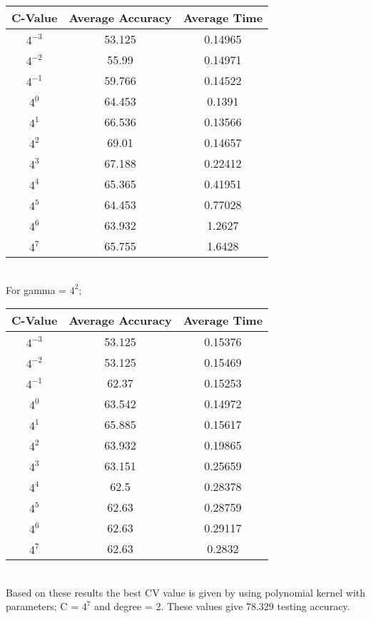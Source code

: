 \documentclass[letter,11pt]{article}
\begin{document}
\begin{tabular}{|c| c |c |} 
	\hline
	C-Value & Average Accuracy & Average Time \\ [0.5ex] 			
	\hline
	$4^{-3}$ & 53.125  & 0.14965 \\ [0.5ex] 
	\hline
	$4^{-2}$ & 55.99  & 0.14971  \\ 
	\hline
	$4^{-1}$ &  59.766  & 0.14522\\
	\hline
	$4^{0}$ & 64.453   & 0.1391\\
	\hline
	$4^{1}$ & 66.536 & 0.13566\\
	\hline
	$4^{2}$ &  69.01 & 0.14657\\
	\hline
	$4^{3}$ &   67.188    & 0.22412\\
	\hline
	$4^{4}$ & 65.365  & 0.41951\\
	\hline
	$4^{5}$ & 64.453      & 0.77028\\
	\hline
	$4^{6}$ &   63.932      & 1.2627\\
	\hline
	$4^{7}$ &  65.755 & 1.6428\\
	\hline	
\end{tabular}\\

For gamma = $4^{2}$;

\begin{tabular}{|c| c |c |} 
	\hline
	C-Value & Average Accuracy & Average Time \\ [0.5ex] 			
	\hline
	$4^{-3}$ & 53.125  & 0.15376 \\ [0.5ex] 
	\hline
	$4^{-2}$ & 53.125   & 0.15469  \\ 
	\hline
	$4^{-1}$ &  62.37   & 0.15253\\
	\hline
	$4^{0}$ & 63.542    & 0.14972\\
	\hline
	$4^{1}$ & 65.885  & 0.15617\\
	\hline
	$4^{2}$ &  63.932 & 0.19865\\
	\hline
	$4^{3}$ &   63.151   & 0.25659\\
	\hline
	$4^{4}$ & 62.5  & 0.28378\\
	\hline
	$4^{5}$ & 62.63      & 0.28759\\
	\hline
	$4^{6}$ &   62.63     & 0.29117 \\
	\hline
	$4^{7}$ &  62.63  & 0.2832\\
	\hline	
\end{tabular}\\

Based on these results the best CV value is given by using polynomial kernel with parameters; C = $4^7$  and degree = 2. These values give 78.329 testing accuracy.
\end{document}
